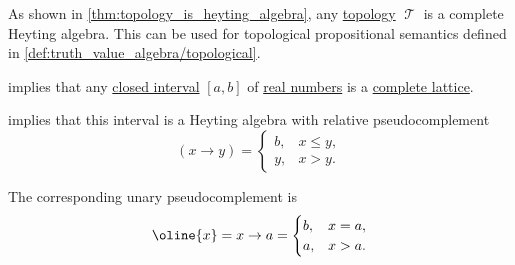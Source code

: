 \begin{example}
\begin{thmenum}
     As shown in \cref{thm:topology_is_heyting_algebra}, any \hyperref[def:topological_space]{topology} \( \mscrT \) is a complete Heyting algebra. This can be used for topological propositional semantics defined in \cref{def:truth_value_algebra/topological}.

      implies that any \hyperref[def:order_interval/closed]{closed interval} \( [a, b] \) of \hyperref[def:real_numbers]{real numbers} is a \hyperref[def:complete_lattice]{complete lattice}.

     implies that this interval is a Heyting algebra with relative pseudocomplement
    \begin{equation*}
      (x \rightarrow y) = \begin{cases}
        b, &x \leq y, \\
        y, &x > y.
      \end{cases}
    \end{equation*}

    The corresponding unary pseudocomplement is
    \begin{equation*}
      \oline{x}
      =
      x \rightarrow a
      =
      \begin{cases}
        b, &x = a, \\
        a, &x > a.
      \end{cases}
    \end{equation*}
  \end{thmenum}
\end{example}


